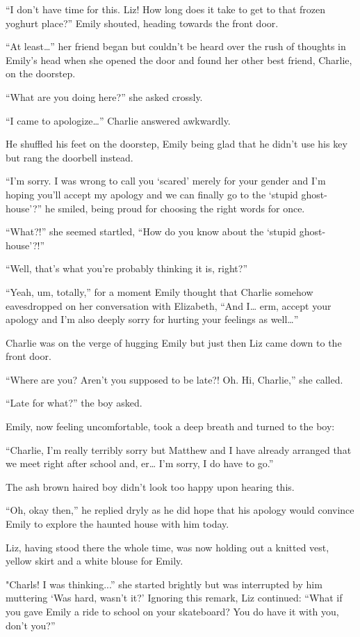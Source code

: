 “I don’t have time for this. Liz! How long does it take to get to that frozen yoghurt place?” Emily shouted, heading towards the front door.

“At least…” her friend began but couldn’t be heard over the rush of thoughts in Emily’s head when she opened the door and found her other best friend, Charlie, on the doorstep.

“What are you doing here?” she asked crossly.

“I came to apologize…” Charlie answered awkwardly.

He shuffled his feet on the doorstep, Emily being glad that he didn’t use his key but rang the doorbell instead.

“I’m sorry. I was wrong to call you ‘scared’ merely for your gender and I’m hoping you’ll accept my apology and we can finally go to the ‘stupid ghost-house’?” he smiled, being proud for choosing the right words for once.

“What?!” she seemed startled, “How do you know about the ‘stupid ghost-house’?!”

“Well, that’s what you’re probably thinking it is, right?”

“Yeah, um, totally,” for a moment Emily thought that Charlie somehow eavesdropped on her conversation with Elizabeth, “And I… erm, accept your apology and I’m also deeply sorry for hurting your feelings as well…”

Charlie was on the verge of hugging Emily but just then Liz came down to the front door.
  
“Where are you? Aren’t you supposed to be late?! Oh. Hi, Charlie,” she called.

“Late for what?” the boy asked.
  
Emily, now feeling uncomfortable, took a deep breath and turned to the boy:

“Charlie, I’m really terribly sorry but Matthew and I have already arranged that we meet right after school and, er… I’m sorry, I do have to go.”

The ash brown haired boy didn’t look too happy upon hearing this.

“Oh, okay then,” he replied dryly as he did hope that his apology would convince Emily to explore the haunted house with him today.

Liz, having stood there the whole time, was now holding out a knitted vest, yellow skirt and a white blouse for Emily.

"Charls! I was thinking...” she started brightly but was interrupted by him muttering ‘Was hard, wasn’t it?’
  Ignoring this remark, Liz continued: “What if you gave Emily a ride to school on your skateboard? You do have it with you, don’t you?”
  
